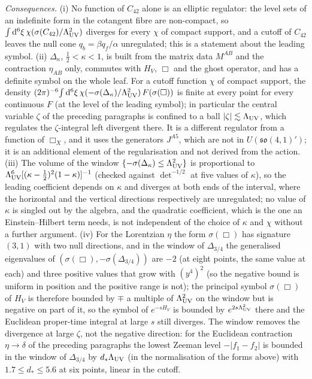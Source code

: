 \emph{Consequences.} (i) No function of \(C_{42}\) alone is an elliptic regulator: the level sets of an indefinite form in the cotangent fibre are non-compact, so \(\int\mathrm d^6\xi\,\chi(\sigma(C_{42})/\Lambda_{\mathrm{UV}}^2)\) diverges for every \(\chi\) of compact support, and a cutoff of \(C_{42}\) leaves the null cone \(q_b=\beta q_f/\alpha\) unregulated; this is a statement about the leading symbol. (ii) \(\Delta_\kappa\), \(\tfrac12<\kappa<1\), is built from the matrix data \(M^{AB}\) and the contraction \(\eta_{AB}\) only, commutes with \(H_V\), \(\Box\) and the ghost operator, and has a definite symbol on the whole leaf. For a cutoff function \(\chi\) of compact support, the density \((2\pi)^{-6}\!\int\mathrm d^6\xi\,\chi(-\sigma(\Delta_\kappa)/\Lambda_{\mathrm{UV}}^2)\,F(\sigma(\Box))\) is finite at every point for every continuous \(F\) (at the level of the leading symbol); in particular the central variable \(\zeta\) of the preceding paragraphs is confined to a ball \(|\zeta|\lesssim\Lambda_{\mathrm{UV}}\), which regulates the \(\zeta\)-integral left divergent there. It is a different regulator from a function of \(\Box_X\), and it uses the generators \(J^{A5}\), which are not in \(U(\mathfrak{so}(4,1)')\); it is an additional element of the regularisation and not derived from the action. (iii) The volume of the window \(\{-\sigma(\Delta_\kappa)\le\Lambda_{\mathrm{UV}}^2\}\) is proportional to \(\Lambda_{\mathrm{UV}}^6[(\kappa-\tfrac12)^2(1-\kappa)]^{-1}\) (checked against \(\det^{-1/2}\) at five values of \(\kappa\)), so the leading coefficient depends on \(\kappa\) and diverges at both ends of the interval, where the horizontal and the vertical directions respectively are unregulated; no value of \(\kappa\) is singled out by the algebra, and the quadratic coefficient, which is the one an Einstein--Hilbert term needs, is not independent of the choice of \(\kappa\) and \(\chi\) without a further argument. (iv) For the Lorentzian \(\eta\) the form \(\sigma(\Box)\) has signature \((3,1)\) with two null directions, and in the window of \(\Delta_{3/4}\) the generalised eigenvalues of \((\sigma(\Box),-\sigma(\Delta_{3/4}))\) are \(-2\) (at eight points, the same value at each) and three positive values that grow with \((y^4)^2\) (so the negative bound is uniform in position and the positive range is not); the principal symbol \(\sigma(\Box)\) of \(H_V\) is therefore bounded by \(\mp\) a multiple of \(\Lambda_{\mathrm{UV}}^2\) on the window but is negative on part of it, so the symbol of \(e^{-sH_V}\) is bounded by \(e^{2s\Lambda_{\mathrm{UV}}^2}\) there and the Euclidean proper-time integral at large \(s\) still diverges. The window removes the divergence at large \(\zeta\), not the negative direction: for the Euclidean contraction \(\eta\to\delta\) of the preceding paragraphs the lowest Zeeman level \(-|f_1-f_2|\) is bounded in the window of \(\Delta_{3/4}\) by \(d_*\Lambda_{\mathrm{UV}}\) (in the normalisation of the forms above) with \(1.7\le d_*\le5.6\) at six points, linear in the cutoff.

